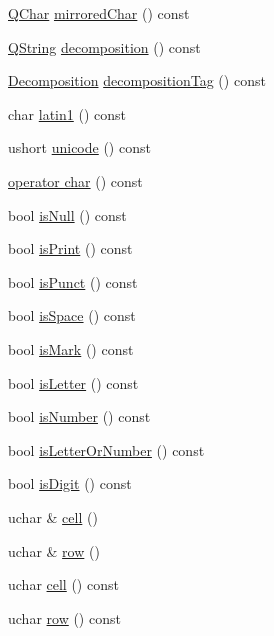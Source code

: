\begin{DoxyCompactItemize}
\hyperlink{class_q_char}{Q\-Char} \hyperlink{class_q_char_ab4c441625b82dd484d352d4150404967}{mirrored\-Char} () const 
\item 
\hyperlink{class_q_string}{Q\-String} \hyperlink{class_q_char_acba9fa01bc9c2d6aad7ef6e16e5aaa1d}{decomposition} () const 
\item 
\hyperlink{class_q_char_a9416cff6b11eb874218733dac5b6ea96}{Decomposition} \hyperlink{class_q_char_a701e7f71528ce064374ada9a645211df}{decomposition\-Tag} () const 
\item 
char \hyperlink{class_q_char_aef586395e322881ad34f67ee323b524d}{latin1} () const 
\item 
ushort \hyperlink{class_q_char_adbb6411982cdf1d5213ca84058629fe3}{unicode} () const 
\item 
\hyperlink{class_q_char_aae10acc60c2317754dcbe79c9b3f1b65}{operator char} () const 
\item 
bool \hyperlink{class_q_char_ac02f2a4d7312eb91f40980adfd4e31b2}{is\-Null} () const 
\item 
bool \hyperlink{class_q_char_ae56bb417ddf53e85cb389267590fe969}{is\-Print} () const 
\item 
bool \hyperlink{class_q_char_ac54b651b84db9e34935a99b83c15e313}{is\-Punct} () const 
\item 
bool \hyperlink{class_q_char_a9aedb2cee15aa1efb95a4b548a22d1f5}{is\-Space} () const 
\item 
bool \hyperlink{class_q_char_aa44c38302b09368a983ead7d288c90fb}{is\-Mark} () const 
\item 
bool \hyperlink{class_q_char_a70265a713cfd82bcea3f690f2b3f655b}{is\-Letter} () const 
\item 
bool \hyperlink{class_q_char_a568ed3e0bc2528a51422e221bb75f3da}{is\-Number} () const 
\item 
bool \hyperlink{class_q_char_aa55a6068a2347ce0ec878be4ed349031}{is\-Letter\-Or\-Number} () const 
\item 
bool \hyperlink{class_q_char_a610bceef174c008df7c7acbbdb76cdf3}{is\-Digit} () const 
\item 
uchar \& \hyperlink{class_q_char_a394d84a6409ef552513d7e486cfaef0a}{cell} ()
\item 
uchar \& \hyperlink{class_q_char_aa0362ae052f9a76a268e0d23859a62f5}{row} ()
\item 
uchar \hyperlink{class_q_char_aedc1937b3c25b2152389eddaf86fa95a}{cell} () const 
\item 
uchar \hyperlink{class_q_char_aa1a82555b4e32743a9d5303ebf7a95a4}{row} () const 
\end{DoxyCompactItemize}
